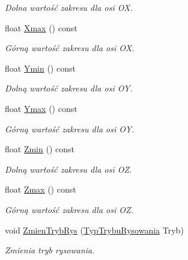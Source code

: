 \begin{DoxyCompactItemize}
\begin{DoxyCompactList}\small\item\em Dolna wartość zakresu dla osi {\itshape OX}. \end{DoxyCompactList}\item 
float \mbox{\hyperlink{class_pz_g_1_1_lacze_do_g_n_u_plota_a8e23479629af3df3d352b7839ae396b8}{Xmax}} () const
\begin{DoxyCompactList}\small\item\em Górną wartość zakresu dla osi {\itshape OX}. \end{DoxyCompactList}\item 
float \mbox{\hyperlink{class_pz_g_1_1_lacze_do_g_n_u_plota_a9352c0382bfaeaaba9f65399a7383164}{Ymin}} () const
\begin{DoxyCompactList}\small\item\em Dolną wartość zakresu dla osi {\itshape OY}. \end{DoxyCompactList}\item 
float \mbox{\hyperlink{class_pz_g_1_1_lacze_do_g_n_u_plota_ac54e4e7448ce3bd324efdc94a999f535}{Ymax}} () const
\begin{DoxyCompactList}\small\item\em Górną wartość zakresu dla osi {\itshape OY}. \end{DoxyCompactList}\item 
float \mbox{\hyperlink{class_pz_g_1_1_lacze_do_g_n_u_plota_a9068bd9a9873ba9c6d70016f1ae7cd7f}{Zmin}} () const
\begin{DoxyCompactList}\small\item\em Dolną wartość zakresu dla osi {\itshape OZ}. \end{DoxyCompactList}\item 
float \mbox{\hyperlink{class_pz_g_1_1_lacze_do_g_n_u_plota_a20a5d03e1fc19c682032bffc54340f12}{Zmax}} () const
\begin{DoxyCompactList}\small\item\em Górną wartość zakresu dla osi {\itshape OZ}. \end{DoxyCompactList}\item 
void \mbox{\hyperlink{class_pz_g_1_1_lacze_do_g_n_u_plota_ae92c65357bf682478cc68f77885b61d8}{Zmien\+Tryb\+Rys}} (\mbox{\hyperlink{namespace_pz_g_aef59d70a0ee2eab473790613c3628944}{Typ\+Trybu\+Rysowania}} Tryb)
\begin{DoxyCompactList}\small\item\em Zmienia tryb rysowania. \end{DoxyCompactList}\item 

\end{DoxyCompactItemize}
